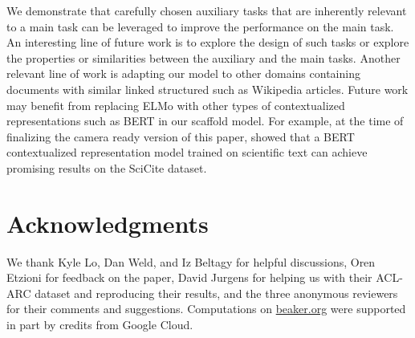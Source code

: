 \documentclass[11pt,a4paper]{article}
\newcommand{\ourdata}{SciCite\xspace}
\begin{document}
We demonstrate that carefully chosen auxiliary tasks that are inherently relevant to a main task can be leveraged to improve the performance on the main task. An interesting line of future work is to explore the design of such tasks or explore the properties or similarities between the auxiliary and the main tasks. Another relevant line of work is adapting our model to other domains containing documents with similar linked structured such as Wikipedia articles.
Future work may benefit from replacing ELMo with other types of contextualized representations such as BERT in our scaffold model. For example, at the time of finalizing the camera ready version of this paper, \citet{Beltagy2019SciBERTPC} showed that a BERT contextualized representation model \cite{Devlin2018BERTPO} trained on scientific text can achieve promising results on the \ourdata dataset.


\section*{Acknowledgments}

We thank Kyle Lo, Dan Weld, and Iz Beltagy for helpful discussions, Oren Etzioni for feedback on the paper, David Jurgens for helping us with their ACL-ARC dataset and reproducing their results, and the three anonymous reviewers for their comments and suggestions. Computations on \url{beaker.org} were supported in part by credits from Google Cloud.





\end{document}

